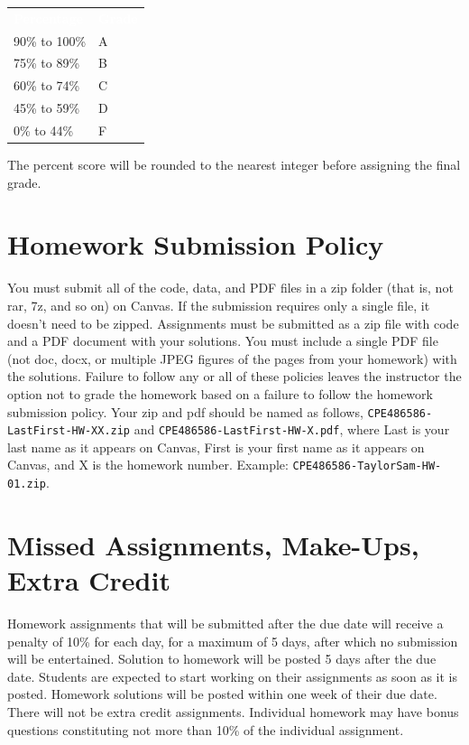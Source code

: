 \documentclass[11pt,oneside,openany]{book}
\begin{document}
\vspace{12pt}
{\renewcommand{\arraystretch}{1.3}%
%
\noindent\begin{tabularx}{\textwidth}{@{}X >{\raggedleft\arraybackslash}p{3cm}@{}}
\rowcolor{deep}\textcolor{white}{\bfseries Percentage} & \textcolor{white}{\bfseries Grade}\\
90\% to 100\% & A\\
75\% to 89\% & B\\
60\% to 74\% & C\\
45\% to 59\% & D\\
0\% to 44\% & F\\
\end{tabularx}}

\vspace{6pt}
The percent score will be rounded to the nearest integer before assigning the final grade.

\section*{Homework Submission Policy}
You must submit all of the code, data, and PDF files in a zip folder (that is, not rar, 7z, and so on) on Canvas. If the submission requires only a single file, it doesn't need to be zipped. Assignments must be submitted as a zip file with code and a PDF document with your solutions. You must include a single PDF file (not doc, docx, or multiple JPEG figures of the pages from your homework) with the solutions. Failure to follow any or all of these policies leaves the instructor the option not to grade the homework based on a failure to follow the homework submission policy. Your zip and pdf should be named as follows, \texttt{CPE486586-LastFirst-HW-XX.zip} and \texttt{CPE486586-LastFirst-HW-X.pdf}, where Last is your last name as it appears on Canvas, First is your first name as it appears on Canvas, and X is the homework number. Example: \texttt{CPE486586-TaylorSam-HW-01.zip}.

\section*{Missed Assignments, Make-Ups, Extra Credit}
Homework assignments that will be submitted after the due date will receive a penalty of 10\% for each day, for a maximum of 5 days, after which no submission will be entertained. Solution to homework will be posted 5 days after the due date. Students are expected to start working on their assignments as soon as it is posted. Homework solutions will be posted within one week of their due date. There will not be extra credit assignments. Individual homework may have bonus questions constituting not more than 10\% of the individual assignment.
\end{document}
